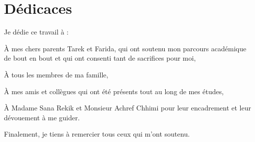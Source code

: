 \chapter*{Dédicaces }



\vskip1cm


\begingroup
     \raggedright 
\setlength{\parskip}{1em}
\setlength{\parindent}{1cm}
\large{
Je dédie ce travail à :

\vspace{4mm}
À mes chers parents Tarek et Farida, qui ont soutenu mon parcours académique de bout en bout et qui ont consenti tant de sacrifices pour moi,

\vspace{4mm}
À tous les membres de ma famille,

\vspace{4mm}
À mes amis et collègues qui ont été présents tout au long de mes études,

\vspace{4mm}
À Madame Sana Rekik et Monsieur Achref Chhimi pour leur encadrement et leur dévouement à me guider.

\vspace{4mm}
Finalement, je tiens à remercier tous ceux qui m'ont soutenu.
}


    
    \vspace{4mm}

\endgroup

\vspace{8mm}





